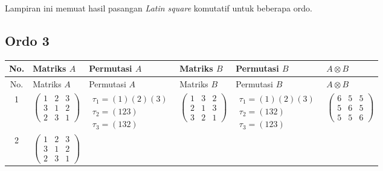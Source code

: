 \noindent
Lampiran ini memuat hasil pasangan \textit{Latin square} komutatif untuk
beberapa ordo.

\subsection*{Ordo 3}

\begingroup
\small
\setlength{\tabcolsep}{3pt}
\renewcommand{\arraystretch}{1.25}
\begin{longtable}{|c|p{2.7cm}|p{2.5cm}|p{2.7cm}|p{2.5cm}|p{2.7cm}|}
    \hline
    No.                                                                         & Matriks $A$ & Permutasi $A$ & Matriks $B$ & Permutasi $B$ & $A \otimes B$ \\
    \hline
    \endfirsthead
    \hline
    No.                                                                         & Matriks $A$ & Permutasi $A$ & Matriks $B$ & Permutasi $B$ & $A \otimes B$ \\
    \hline
    \endhead
    1                                                                           &
    $\begin{pmatrix}1&2&3\\3&1&2\\2&3&1\end{pmatrix}$                           &
    $\begin{array}{l}\tau_1=(1)(2)(3)\\ \tau_2=(123)\\ \tau_3=(132)\end{array}$ &
    $\begin{pmatrix}1&3&2\\2&1&3\\3&2&1\end{pmatrix}$                           &
    $\begin{array}{l}\tau_1=(1)(2)(3)\\ \tau_2=(132)\\ \tau_3=(123)\end{array}$ &
    $\begin{pmatrix}6&5&5\\5&6&5\\5&5&6\end{pmatrix}$                                                                                                       \\
    \hline
    2                                                                           &
    $\begin{pmatrix}1&2&3\\3&1&2\\2&3&1\end{pmatrix}$                           &

\end{longtable}
